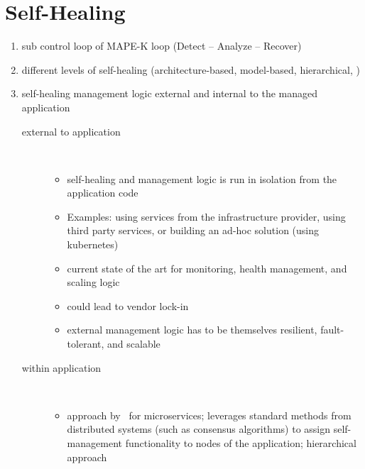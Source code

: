 \section{Self-Healing}
  \begin{enumerate}
    \item sub control loop of MAPE-K loop (Detect -- Analyze -- Recover)~\cite{PsaierSurvey}
    \item different levels of self-healing (architecture-based, model-based, hierarchical, \etc)
    \item self-healing management logic external and internal to the managed application
      \begin{description}
        \item[external to application]\hfill\\
          \begin{itemize}
            \item self-healing and management logic is run in isolation from the application code
            \item Examples: using services from the infrastructure provider, using third party services, or building an ad-hoc solution (\eg using \gls{kubernetes})~\cite{ToffettiMicroservices}
            \item current state of the art for monitoring, health management, and scaling logic
            \item could lead to vendor lock-in
            \item external management logic has to be themselves resilient, fault-tolerant, and scalable
          \end{itemize}
        \item[within application]\hfill\\
        \begin{itemize}
          \item approach by~\citeauthor{ToffettiMicroservices} for microservices; leverages standard methods from distributed systems (such as consensus algorithms) to assign self-management functionality to nodes of the application; hierarchical approach~\cite{ToffettiMicroservices}
        \end{itemize}
      \end{description}
  \end{enumerate}

